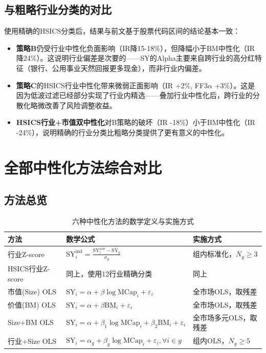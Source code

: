 \documentclass[10pt,a4paper]{ctexart}
\begin{document}
\subsection{与粗略行业分类的对比}

使用精确的HSICS分类后，结果与前文基于股票代码区间的结论基本一致：

\begin{itemize}
    \item \textbf{策略B}仍受行业中性化负面影响（IR降15-18\%），但降幅小于BM中性化（IR降24\%）。这说明行业偏差是次要的——SY的Alpha主要来自跨行业的高分红特征（银行、公用事业天然回报更多现金），而非行业内偏差。
    \item \textbf{策略C}的HSICS行业中性化带来微弱正面影响（IR +2\%, FF3$\alpha$ +3\%）。这是因为低波过滤已经部分实现了行业内精选——叠加行业中性化后，跨行业的分散化略微改善了风险调整收益。
    \item \textbf{HSICS行业+市值双中性化}对B策略的破坏（IR -18\%）小于BM中性化（IR -24\%），说明精确的行业分类比粗略分类提供了更有意义的中性化。
\end{itemize}

\section{全部中性化方法综合对比}

\subsection{方法总览}

\begin{table}[htbp]
\centering
\caption{六种中性化方法的数学定义与实施方式}
\begin{tabular}{lp{3cm}p{5cm}}
\toprule
\textbf{方法} & \textbf{数学公式} & \textbf{实施方式} \\
\midrule
行业Z-score & $\text{SY}_i^{\text{ind}} = \frac{\text{SY}_i^{\text{raw}} - \bar{\text{SY}}_g}{\sigma_g}$ & 组内标准化，$N_g \geq 3$ \\
HSICS行业Z-score & 同上，使用12行业精确分类 & 同上 \\
市值(Size) OLS & $\text{SY}_i = \alpha + \beta\log\text{MCap}_i + \varepsilon_i$ & 全市场OLS，取残差 \\
价值(BM) OLS & $\text{SY}_i = \alpha + \beta\text{BM}_i + \varepsilon_i$ & 全市场OLS，取残差 \\
Size+BM OLS & $\text{SY}_i = \alpha + \beta_1\log\text{MCap}_i + \beta_2\text{BM}_i + \varepsilon_i$ & 全市场多元OLS，取残差 \\
行业+Size OLS & $\text{SY}_i = \alpha_g + \beta_g\log\text{MCap}_i + \varepsilon_i, \forall i \in g$ & 组内OLS，$N_g \geq 5$ \\
\bottomrule
\end{tabular}
\end{table}
\end{document}
